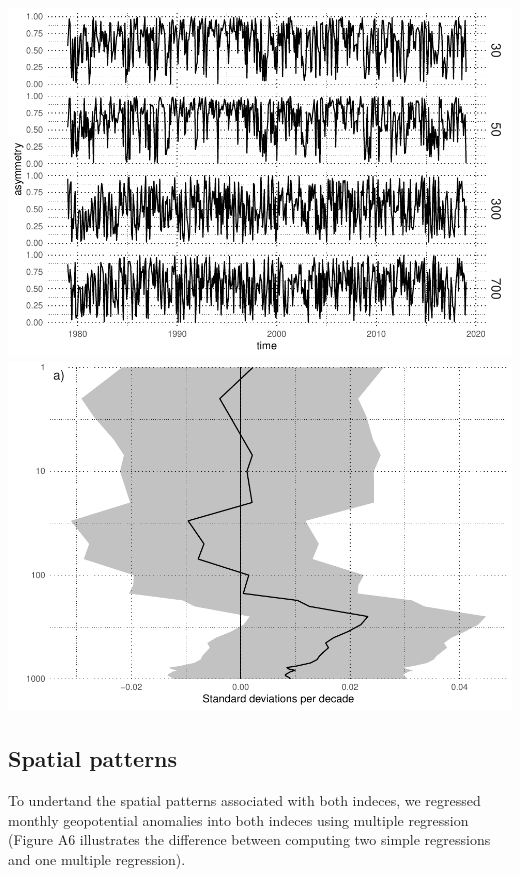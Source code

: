 \documentclass[]{ametsocV5}
\begin{document}
\includegraphics{unnamed-chunk-1-3} \includegraphics{unnamed-chunk-1-4}

\subsection{Spatial patterns}

To undertand the spatial patterns associated with both indeces, we
regressed monthly geopotential anomalies into both indeces using
multiple regression (Figure A6 illustrates the difference between
computing two simple regressions and one multiple regression).
\end{document}
